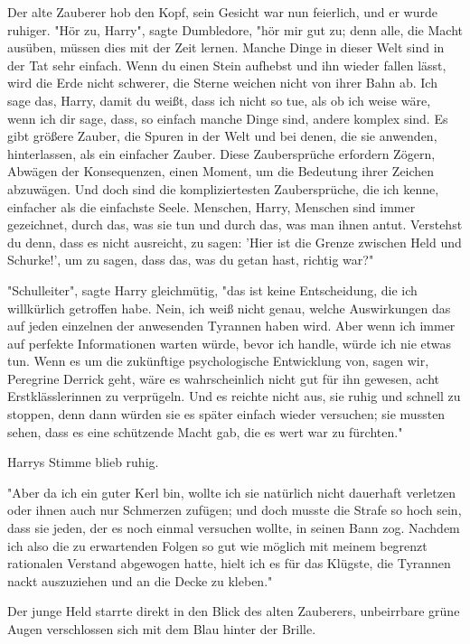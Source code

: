{Der alte Zauberer hob den Kopf, sein Gesicht war nun feierlich, und er wurde ruhiger. "Hör zu, Harry", sagte Dumbledore, "hör mir gut zu; denn alle, die Macht ausüben, müssen dies mit der Zeit lernen. Manche Dinge in dieser Welt sind in der Tat sehr einfach. Wenn du einen Stein aufhebst und ihn wieder fallen lässt, wird die Erde nicht schwerer, die Sterne weichen nicht von ihrer Bahn ab. Ich sage das, Harry, damit du weißt, dass ich nicht so tue, als ob ich weise wäre, wenn ich dir sage, dass, so einfach manche Dinge sind, andere komplex sind. Es gibt größere Zauber, die Spuren in der Welt und bei denen, die sie anwenden, hinterlassen, als ein einfacher Zauber. Diese Zaubersprüche erfordern Zögern, Abwägen der Konsequenzen, einen Moment, um die Bedeutung ihrer Zeichen abzuwägen. Und doch sind die kompliziertesten Zaubersprüche, die ich kenne, einfacher als die einfachste Seele. Menschen, Harry, Menschen sind immer gezeichnet, durch das, was sie tun und durch das, was man ihnen antut. Verstehst du denn, dass es nicht ausreicht, zu sagen: 'Hier ist die Grenze zwischen Held und Schurke!', um zu sagen, dass das, was du getan hast, richtig war?"

"Schulleiter", sagte Harry gleichmütig, "das ist keine Entscheidung, die ich willkürlich getroffen habe. Nein, ich weiß nicht genau, welche Auswirkungen das auf jeden einzelnen der anwesenden Tyrannen haben wird. Aber wenn ich immer auf perfekte Informationen warten würde, bevor ich handle, würde ich nie etwas tun. Wenn es um die zukünftige psychologische Entwicklung von, sagen wir, Peregrine Derrick geht, wäre es wahrscheinlich nicht gut für ihn gewesen, acht Erstklässlerinnen zu verprügeln. Und es reichte nicht aus, sie ruhig und schnell zu stoppen, denn dann würden sie es später einfach wieder versuchen; sie mussten sehen, dass es eine schützende Macht gab, die es wert war zu fürchten."

Harrys Stimme blieb ruhig.

"Aber da ich ein guter Kerl bin, wollte ich sie natürlich nicht dauerhaft verletzen oder ihnen auch nur Schmerzen zufügen; und doch musste die Strafe so hoch sein, dass sie jeden, der es noch einmal versuchen wollte, in seinen Bann zog. Nachdem ich also die zu erwartenden Folgen so gut wie möglich mit meinem begrenzt rationalen Verstand abgewogen hatte, hielt ich es für das Klügste, die Tyrannen nackt auszuziehen und an die Decke zu kleben."

Der junge Held starrte direkt in den Blick des alten Zauberers, unbeirrbare grüne Augen verschlossen sich mit dem Blau hinter der Brille.

}
